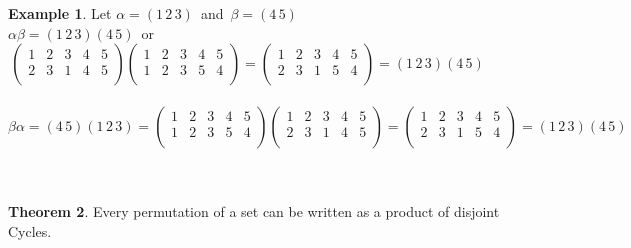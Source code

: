 \documentclass[11pt,a4paper]{article}
\theoremstyle{definition}
\newtheorem{thm}{Theorem}[subsection]
\newtheorem{exa}[thm]{Example}
\begin{document}
\begin{exa}
Let $\alpha = (1\, 2\, 3)\,$ and $\, \beta = (4\, 5)$\\

$\alpha\beta = (1\, 2\, 3)(4\,5)\,$ or $\, \begin{pmatrix}
1 & 2 & 3 & 4 & 5\\
2 & 3 & 1 & 4 & 5\\
\end{pmatrix} \begin{pmatrix}
1 & 2 & 3 & 4 & 5\\
1 & 2 & 3 & 5 & 4\\
\end{pmatrix} = \begin{pmatrix}
1 & 2 & 3 & 4 & 5\\
2 & 3 & 1 & 5 & 4\\
\end{pmatrix} = (1\, 2\, 3)(4\, 5)$\\\\


$\beta\alpha = (4\, 5)(1\, 2\, 3) = \begin{pmatrix}
1 & 2 & 3 & 4 & 5\\
1 & 2 & 3 & 5 & 4\\
\end{pmatrix}\begin{pmatrix}
1 & 2 & 3 & 4 & 5\\
2 & 3 & 1 & 4 & 5\\
\end{pmatrix} = \begin{pmatrix}
1 & 2 & 3 & 4 & 5\\
2 & 3 & 1 & 5 & 4\\
\end{pmatrix} = (1\, 2\, 3)(4\,5)$\\\\\\
\end{exa}





\begin{thm}
Every permutation of a set can be written as a product of disjoint Cycles.\\
\end{thm}
\end{document}
